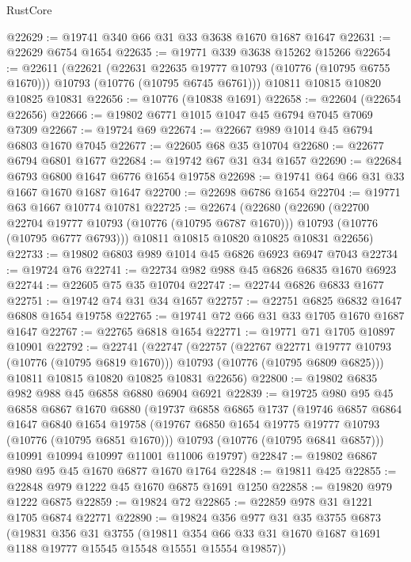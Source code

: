 \begin{lexlean}{RustCore}
\begin{coremodule}
@22629 := @19741 @340 @66 @31 @33 @3638 @1670 @1687 @1647
@22631 := @22629 @6754 @1654
@22635 := @19771 @339 @3638 @15262 @15266
@22654 := @22611
    (@22621
      (@22631 @22635 @19777 @10793 (@10776 (@10795 @6755 @1670)))
      @10793
      (@10776 (@10795 @6745 @6761)))
    @10811
    @10815
    @10820
    @10825
    @10831
@22656 := @10776 (@10838 @1691)
@22658 := @22604 (@22654 @22656)
@22666 := @19802 @6771 @1015 @1047 @45 @6794 @7045 @7069 @7309
@22667 := @19724 @69
@22674 := @22667 @989 @1014 @45 @6794 @6803 @1670 @7045
@22677 := @22605 @68 @35 @10704
@22680 := @22677 @6794 @6801 @1677
@22684 := @19742 @67 @31 @34 @1657
@22690 := @22684 @6793 @6800 @1647 @6776 @1654 @19758
@22698 := @19741 @64 @66 @31 @33 @1667 @1670 @1687 @1647
@22700 := @22698 @6786 @1654
@22704 := @19771 @63 @1667 @10774 @10781
@22725 := @22674
    (@22680
      (@22690
        (@22700 @22704 @19777 @10793 (@10776 (@10795 @6787 @1670)))
        @10793
        (@10776 (@10795 @6777 @6793)))
      @10811
      @10815
      @10820
      @10825
      @10831
      @22656)
@22733 := @19802 @6803 @989 @1014 @45 @6826 @6923 @6947 @7043
@22734 := @19724 @76
@22741 := @22734 @982 @988 @45 @6826 @6835 @1670 @6923
@22744 := @22605 @75 @35 @10704
@22747 := @22744 @6826 @6833 @1677
@22751 := @19742 @74 @31 @34 @1657
@22757 := @22751 @6825 @6832 @1647 @6808 @1654 @19758
@22765 := @19741 @72 @66 @31 @33 @1705 @1670 @1687 @1647
@22767 := @22765 @6818 @1654
@22771 := @19771 @71 @1705 @10897 @10901
@22792 := @22741
    (@22747
      (@22757
        (@22767 @22771 @19777 @10793 (@10776 (@10795 @6819 @1670)))
        @10793
        (@10776 (@10795 @6809 @6825)))
      @10811
      @10815
      @10820
      @10825
      @10831
      @22656)
@22800 := @19802 @6835 @982 @988 @45 @6858 @6880 @6904 @6921
@22839 := @19725
    @980
    @95
    @45
    @6858
    @6867
    @1670
    @6880
    (@19737
      @6858
      @6865
      @1737
      (@19746
        @6857
        @6864
        @1647
        @6840
        @1654
        @19758
        (@19767 @6850 @1654 @19775 @19777 @10793 (@10776 (@10795 @6851 @1670)))
        @10793
        (@10776 (@10795 @6841 @6857)))
      @10991
      @10994
      @10997
      @11001
      @11006
      @19797)
@22847 := @19802 @6867 @980 @95 @45 @1670 @6877 @1670 @1764
@22848 := @19811 @425
@22855 := @22848 @979 @1222 @45 @1670 @6875 @1691 @1250
@22858 := @19820 @979 @1222 @6875
@22859 := @19824 @72
@22865 := @22859 @978 @31 @1221 @1705 @6874 @22771
@22890 := @19824
    @356
    @977
    @31
    @35
    @3755
    @6873
    (@19831
      @356
      @31
      @3755
      (@19811 @354 @66 @33 @31 @1670 @1687 @1691 @1188 @19777 @15545 @15548 @15551 @15554 @19857))

\end{coremodule}
\end{lexlean}
